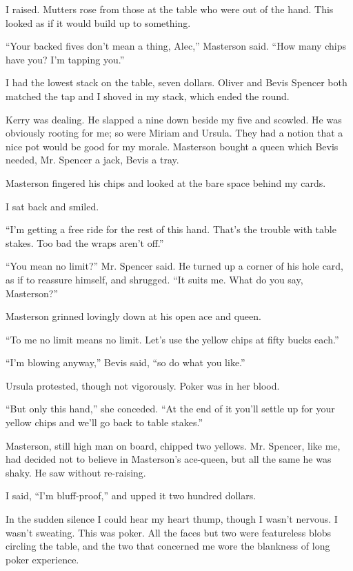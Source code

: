 \documentclass{novel}
\begin{document}
I raised. Mutters rose from those at the table who were out of the hand. This looked as if it would build up to something.

“Your backed fives don’t mean a thing, Alec,” Masterson said. “How many chips have you? I’m tapping you.”

I had the lowest stack on the table, seven dollars. Oliver and Bevis Spencer both matched the tap and I shoved in my stack, which ended the round.

\scenestars

Kerry was dealing. He slapped a nine down beside my five and scowled. He was obviously rooting for me; so were Miriam and Ursula. They had a notion that a nice pot would be good for my morale. Masterson bought a queen which Bevis needed, Mr. Spencer a jack, Bevis a tray.

Masterson fingered his chips and looked at the bare space behind my cards.

I sat back and smiled. 

“I’m getting a free ride for the rest of this hand. That’s the trouble with table stakes. Too bad the wraps aren’t off.”

“You mean no limit?” Mr. Spencer said. He turned up a corner of his hole card, as if to reassure himself, and shrugged. “It suits me. What do you say, Masterson?”

Masterson grinned lovingly down at his open ace and queen. 

“To me no limit means no limit. Let’s use the yellow chips at fifty bucks each.”

“I’m blowing anyway,” Bevis said, “so do what you like.”

Ursula protested, though not vigorously. Poker was in her blood. 

“But only this hand,” she conceded. “At the end of it you’ll settle up for your yellow chips and we’ll go back to table stakes.”

Masterson, still high man on board, chipped two yellows. Mr. Spencer, like me, had decided not to believe in Masterson’s ace-queen, but all the same he was shaky. He saw without re-raising.

I said, “I’m bluff-proof,” and upped it two hundred dollars.

In the sudden silence I could hear my heart thump, though I wasn’t nervous. I wasn’t sweating. This was poker. All the faces but two were featureless blobs circling the table, and the two that concerned me wore the blankness of long poker experience.
\end{document}
